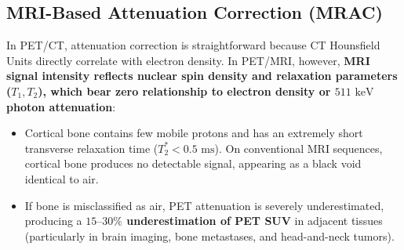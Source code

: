 \documentclass[11pt,a4paper]{article}
\begin{document}
\subsection{MRI-Based Attenuation Correction (MRAC)}
In PET/CT, attenuation correction is straightforward because CT Hounsfield Units directly correlate with electron density. In PET/MRI, however, \textbf{MRI signal intensity reflects nuclear spin density and relaxation parameters ($T_1, T_2$), which bear zero relationship to electron density or $511\text{ keV}$ photon attenuation}:
\begin{itemize}[leftmargin=2em]
    \item Cortical bone contains few mobile protons and has an extremely short transverse relaxation time ($T_2^* < 0.5\text{ ms}$). On conventional MRI sequences, cortical bone produces no detectable signal, appearing as a black void identical to air.
    \item If bone is misclassified as air, PET attenuation is severely underestimated, producing a \textbf{$15\text{--}30\%$ underestimation of PET SUV} in adjacent tissues (particularly in brain imaging, bone metastases, and head-and-neck tumors).
\end{itemize}
\end{document}
